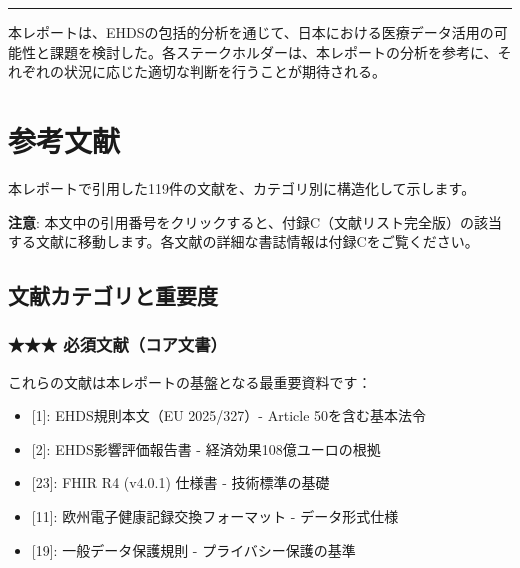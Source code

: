 \documentclass[
  a4paper,
  a4paper,
  11pt]{ltjsbook}
\providecommand{\tightlist}{%
  \setlength{\itemsep}{0pt}\setlength{\parskip}{0pt}}
\begin{document}
\begin{center}\rule{0.5\linewidth}{0.5pt}\end{center}

本レポートは、EHDSの包括的分析を通じて、日本における医療データ活用の可能性と課題を検討した。各ステークホルダーは、本レポートの分析を参考に、それぞれの状況に応じた適切な判断を行うことが期待される。


\chapter{参考文献}\label{ux53c2ux8003ux6587ux732e}

本レポートで引用した119件の文献を、カテゴリ別に構造化して示します。

\begin{tcolorbox}[enhanced jigsaw, toprule=.15mm, bottomtitle=1mm, coltitle=black, left=2mm, opacityback=0, arc=.35mm, colbacktitle=quarto-callout-note-color!10!white, colback=white, opacitybacktitle=0.6, bottomrule=.15mm, rightrule=.15mm, breakable, title=\textcolor{quarto-callout-note-color}{\faInfo}\hspace{0.5em}{Note}, toptitle=1mm, titlerule=0mm, colframe=quarto-callout-note-color-frame, leftrule=.75mm]

\textbf{注意}:
本文中の引用番号をクリックすると、付録C（文献リスト完全版）の該当する文献に移動します。各文献の詳細な書誌情報は付録Cをご覧ください。

\end{tcolorbox}

\section{文献カテゴリと重要度}\label{ux6587ux732eux30abux30c6ux30b4ux30eaux3068ux91cdux8981ux5ea6}

\subsection{★★★
必須文献（コア文書）}\label{ux5fc5ux9808ux6587ux732eux30b3ux30a2ux6587ux66f8}

これらの文献は本レポートの基盤となる最重要資料です：

\begin{itemize}
\tightlist
\item
  {[}1{]}: EHDS規則本文（EU 2025/327）- Article 50を含む基本法令
\item
  {[}2{]}: EHDS影響評価報告書 - 経済効果108億ユーロの根拠
\item
  {[}23{]}: FHIR R4 (v4.0.1) 仕様書 - 技術標準の基礎
\item
  {[}11{]}: 欧州電子健康記録交換フォーマット - データ形式仕様
\item
  {[}19{]}: 一般データ保護規則 - プライバシー保護の基準
\end{itemize}
\end{document}
